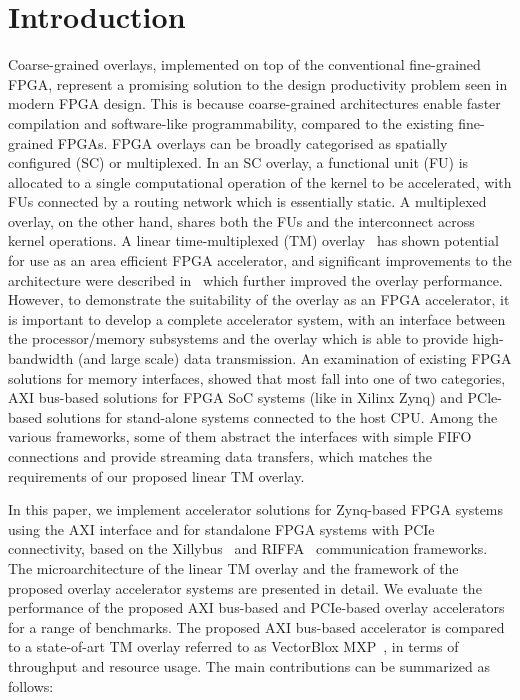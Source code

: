\section{Introduction}
Coarse-grained overlays, implemented on top of the conventional fine-grained FPGA, represent a promising solution to the design productivity problem seen in modern FPGA design. This is because coarse-grained architectures enable faster compilation and software-like programmability, compared to the existing fine-grained FPGAs.  
FPGA overlays can be broadly categorised as spatially configured (SC) or multiplexed. In an SC overlay, a functional unit (FU) is allocated to a single computational operation of the kernel to be accelerated, with FUs connected by a routing network which is essentially static. A multiplexed overlay, on the other hand, shares both the FUs and the interconnect across kernel operations.
A linear time-multiplexed (TM) overlay~\cite{li2016area} has shown potential for use as an area efficient FPGA accelerator, and significant improvements to the architecture were described in~\cite{li2018time} which further improved the overlay performance.
However, to demonstrate the suitability of the overlay as an FPGA accelerator, it is important to develop a complete accelerator system, with an interface between the processor/memory subsystems and the overlay which is able to provide high-bandwidth (and large scale) data transmission.
An examination of existing FPGA solutions for memory interfaces, showed that most fall into one of two categories, AXI bus-based solutions for FPGA SoC systems (like in Xilinx Zynq) and PCle-based solutions for stand-alone systems connected to the host CPU. 
Among the various frameworks, some of them abstract the interfaces with simple FIFO connections and provide streaming data transfers, which matches the requirements of our proposed linear TM overlay. 

In this paper, we implement accelerator solutions for Zynq-based FPGA systems using the AXI interface and for standalone FPGA systems with PCIe connectivity, based on the Xillybus~\cite{xillybus2018} and RIFFA~\cite{jacobsen2015riffa} communication frameworks. 
The microarchitecture of the linear TM overlay and the framework of the proposed overlay accelerator systems are presented in detail. 
We evaluate the performance of the proposed AXI bus-based and PCIe-based overlay accelerators for a range of benchmarks. 
The proposed AXI bus-based accelerator is compared to a state-of-art TM overlay referred to as VectorBlox MXP~\cite{severance2013embedded}, in terms of throughput and resource usage. 
The main contributions can be summarized as follows:

